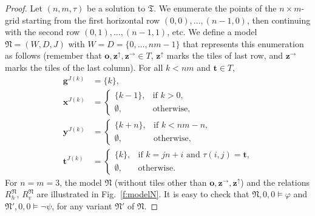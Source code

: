 \documentclass{lmcs} %
\theoremstyle{plain}\newtheorem{satz}[thm]{Satz} %
\newcommand{\tiling}{\mathfrak T}
\newcommand{\bbvarup}{\Zvar^\uparrow}
\newcommand{\bbvarright}{\Zvar^\to}
\newcommand{\fform}[1]{\boldsymbol{#1}}
\newcommand{\gvar}{\fform{g}}
\newcommand{\tvar}{\fform{t}}
\newcommand{\xvar}{\fform{x}}
\newcommand{\yvar}{\fform{y}}
\newcommand{\ovar}{\fform{o}}
\newcommand{\Zvar}{\fform{z}}
\begin{document}
\begin{proof}
	Let $(n,m,\tau)$ be a solution to $\tiling$. We enumerate the points of the $n\times m$-grid starting from the first horizontal row $(0,0),\dots, (n-1,0)$, then continuing with the second row $(0,1),\dots,(n-1,1)$, etc. 
	We define a model $\mathfrak{N}=(W,D,J)$ with $W=D=\{0,\dots,nm-1\}$ that represents this enumeration as follows (remember that $\ovar,\bbvarup,\bbvarright\in T$, $\bbvarup$ marks the tiles of last row, and  $\bbvarright$ marks the tiles of the last column). 
	For all $k<nm$ and $\tvar\in T$, 
	\begin{align}
		\label{Nfirst}
		\gvar^{J(k)} & =\{k\},\\
	\xvar^{J(k)} & = \left\{
		\begin{array}{ll}
			\{k-1\},  & \mbox{if $k>0$,}\\[3pt]
			\emptyset, &\mbox{otherwise,}
		\end{array}
		\right.\\
	\yvar^{J(k)} & = \left\{
		\begin{array}{ll}
			\{k+n\},  & \mbox{if $k<nm-n$,}\\[3pt]
			\emptyset, &\mbox{otherwise,}
		\end{array}
		\right.\\	
		\label{Nlast}
		\tvar^{J(k)} & = \left\{
		\begin{array}{ll}
			\{k\},  & \mbox{if $k=jn+i$ and $\tau(i,j)=\tvar$,}\\[3pt]
			\emptyset, &\mbox{otherwise.}
		\end{array}
		\right.
	\end{align}
	For $n=m=3$, the model $\mathfrak N$ (without tiles other than $\ovar,\bbvarright,\bbvarup$) and the relations $R_h^\mathfrak N$, $R_v^\mathfrak N$ are illustrated in Fig.~\ref{f:modelN}.
	It is easy to check that $\mathfrak{N},0,0\models \varphi$ and $\mathfrak{N}',0,0\models \neg\psi$, for any variant $\mathfrak{N}'$ of $\mathfrak{N}$. 
	

\end{proof}
\end{document}
